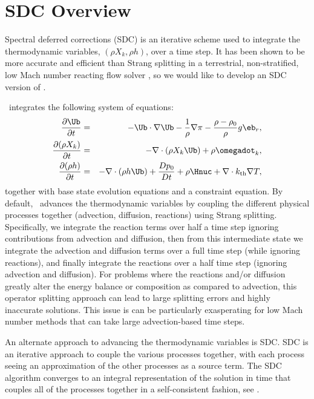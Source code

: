 \label{ch:sdc}

\section{SDC Overview}

Spectral deferred corrections (SDC) is an iterative scheme used to integrate
the thermodynamic variables, $(\rho X_k,\rho h)$, over a time step.  It has
been shown to be more accurate and efficient than Strang splitting in a
terrestrial, non-stratified, low Mach number reacting flow solver \cite{Non11},
so we would like to develop an SDC version of \maestro.

\maestro\ integrates the following system of equations:
\begin{eqnarray}
\frac{\partial\Ub}{\partial t} &=& 
    -\Ub\cdot\nabla\Ub  - \frac{1}{\rho}\nabla\pi 
    - \frac{\rho-\rho_0}{\rho} g\eb_r,\label{eq:momentum}\\
\frac{\partial(\rho X_k)}{\partial t} &=& 
    -\nabla\cdot(\rho X_k\Ub) + \rho\omegadot_k,\label{eq:species}\\
\frac{\partial(\rho h)}{\partial t} &=& 
    -\nabla\cdot(\rho h\Ub) + \frac{Dp_0}{Dt} 
    + \rho\Hnuc + \nabla\cdot k_{\rm th}\nabla T,\label{eq:enthalpy}
\end{eqnarray}
together with base state evolution equations and a constraint equation.
By default, \maestro\ advances the thermodynamic variables by coupling
the different physical processes together (advection, diffusion, reactions) using
Strang splitting.  Specifically, we integrate the reaction terms 
over half a time step ignoring contributions from advection and diffusion,
then from this intermediate state we integrate the advection and diffusion terms over
a full time step (while ignoring reactions), and finally
integrate the reactions over a half time step (ignoring advection and diffusion).
For problems where
the reactions and/or diffusion greatly alter the energy balance or composition 
as compared to advection, this operator splitting approach can lead to large 
splitting errors and highly inaccurate solutions.
This issue is can be particularly exasperating 
for low Mach number methods that can take large advection-based time steps.

An alternate approach to advancing the thermodynamic variables is SDC. 
SDC is an iterative approach to couple the various processes
together, with each process seeing an 
approximation of the other processes as a source term.  The SDC
algorithm converges to an integral representation of the solution in
time that couples all of the processes together in a self-consistent
fashion, see \cite{Non11}.

